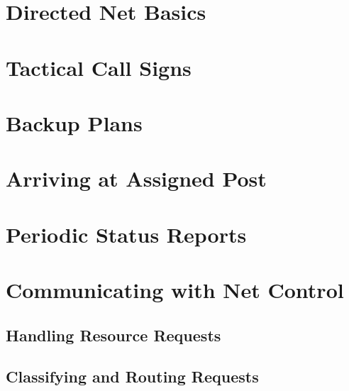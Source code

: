 \documentclass[pdflatex,letterpaper,twoside,12pt]{book}
\begin{document}
\section{Directed Net Basics}


\section{Tactical Call Signs}


\section{Backup Plans}


\section{Arriving at Assigned Post}


\section{Periodic Status Reports}


\section{Communicating with Net Control}

\subsection{Handling Resource Requests}

\subsection{Classifying and Routing Requests}
\end{document}
